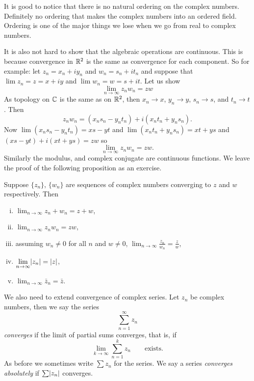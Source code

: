 \begin{remark}
It is good to notice that there is no natural ordering on the complex numbers.
Definitely no ordering that makes the complex numbers into an ordered field.
Ordering is one of the major things we lose when we go from real to complex
numbers.
\end{remark}

It is also not hard to show that the algebraic operations are
continuous.  This is because convergence in 
${\mathbb{R}}^2$ is the same as convergence for each component.  So for example:
let $z_n = x_n + iy_n$ and
$w_n = s_n + it_n$ and suppose that
$\lim z_n = z = x+iy$ and $\lim w_n = w = s+it$.
Let us show
\begin{equation*}
\lim_{n\to\infty} z_n w_n = zw
\end{equation*}
As topology on ${\mathbb{C}}$ is the same as on ${\mathbb{R}}^2$, then
$x_n \to x$, $y_n \to y$, $s_n \to s$, and $t_n \to t$.  Then
\begin{equation*}
z_n w_n = (x_ns_n-y_nt_n) + i(x_nt_n+y_ns_n) .
\end{equation*}
Now 
$\lim (x_ns_n-y_nt_n) = xs-yt$ and
$\lim (x_nt_n+y_ns_n) = xt+ys$ and
$(xs-yt)+i(xt+ys) = zw$ so
\begin{equation*}
\lim_{n\to\infty} z_n w_n = zw .
\end{equation*}
Similarly the modulus, and complex conjugate are continuous functions.  We
leave the proof of the following proposition as an exercise.

\begin{prop} \label{prop:continuityofcomplex}
Suppose $\{ z_n \}$, $\{ w_n \}$ are sequences of complex numbers converging
to $z$ and $w$ respectively.  Then
\begin{enumerate}[(i)]
\item
$\displaystyle \lim_{n\to \infty} z_n + w_n = z + w$,
\item
$\displaystyle \lim_{n\to \infty} z_n w_n = z w$,
\item
assuming $w_n \not= 0$ for all $n$ and $w\not= 0$,
$\displaystyle \lim_{n\to \infty} \frac{z_n}{w_n} = \frac{z}{w}$,
\item
$\displaystyle \lim_{n\to \infty} \lvert {z_n} \rvert = \lvert {z} \rvert$,
\item
$\displaystyle \lim_{n\to \infty} \bar{z}_n = \bar{z}$.
\end{enumerate}
\end{prop}

We also need to extend convergence of complex series.  Let $z_n$ be complex
numbers, then we say the series
\begin{equation*}
\sum_{n=1}^\infty z_n
\end{equation*}
\emph{converges} if the limit of partial sums converges, that is, if
\begin{equation*}
\lim_{k\to\infty} \sum_{n=1}^k z_n \qquad \text{exists.}
\end{equation*}
As before we sometimes write $\sum z_n$ for the series.
We say a series \emph{converges absolutely} if $\sum \lvert {z_n} \rvert$ converges.

